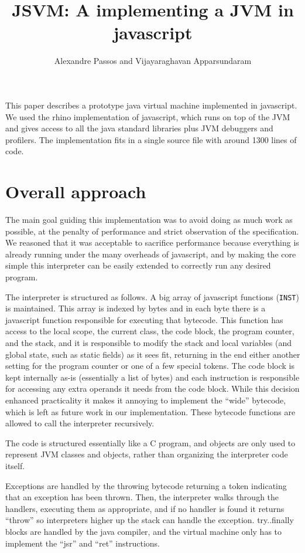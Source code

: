 \documentclass{article}
\author{Alexandre Passos and Vijayaraghavan Apparsundaram}
\title{JSVM: A implementing a JVM in javascript}
\begin{document}
\maketitle

This paper describes a prototype java virtual machine implemented in
javascript. We used the rhino implementation of javascript, which runs
on top of the JVM and gives access to all the java standard libraries
plus JVM debuggers and profilers. The implementation fits in a single
source file with around 1300 lines of code.

\section{Overall approach}
\label{sec:overall-approach}

The main goal guiding this implementation was to avoid doing as much
work as possible, at the penalty of performance and strict observation
of the specification.  We reasoned that it was acceptable to sacrifice
performance because everything is already running under the many
overheads of javascript, and by making the core simple this
interpreter can be easily extended to correctly run any desired
program.

The interpreter is structured as follows. A big array of javascript
functions (\texttt{INST}) is maintained. This array is indexed by
bytes and in each byte there is a javascript function responsible for
executing that bytecode. This function has access to the local scope,
the current class, the code block, the program counter, and
the stack, and it is responsible to modify the stack and local
variables (and global state, such as static fields) as it sees fit,
returning in the end either another setting for the program counter or
one of a few special tokens. The code block is kept internally as-is
(essentially a list of bytes) and each instruction is responsible for
accessing any extra operands it needs from the code block. While this
decision enhanced practicality it makes it annoying to implement the
``wide'' bytecode, which is left as future work in our
implementation. These bytecode functions are allowed to call the
interpreter recursively.

The code is structured essentially like a C program, and objects are
only used to represent JVM classes and objects, rather than organizing
the interpreter code itself. 

Exceptions are handled by the throwing bytecode returning a token
indicating that an exception has been thrown. Then, the interpreter
walks through the handlers, executing them as appropriate, and if no
handler is found it returns ``throw'' so interpreters higher up the
stack can handle the exception. try..finally blocks are handled by the
java compiler, and the virtual machine only has to implement the
``jsr'' and ``ret'' instructions.
\end{document}

